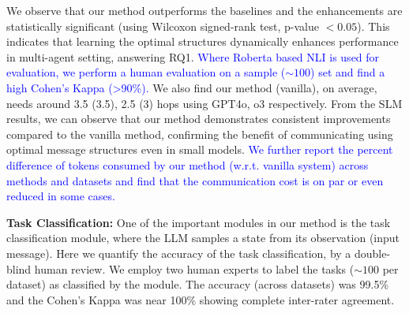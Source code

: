 We observe that our method outperforms the baselines and the enhancements are statistically significant (using Wilcoxon signed-rank test, p-value $< 0.05$). This indicates that learning the optimal structures dynamically enhances performance in multi-agent setting, answering RQ1. 
\textcolor{blue}{Where Roberta based NLI is used for evaluation, we perform a human evaluation on a sample ($\sim 100$) set and find a high Cohen's Kappa \cite{Cohen07} (>90\%).}
We also find our method (vanilla), on average, needs around 3.5 (3.5), 2.5 (3) hops using GPT4o, o3 respectively. 
From the SLM results,
 we can observe that our method demonstrates consistent improvements compared to the vanilla method, confirming the benefit of communicating using optimal message structures even in small models. \textcolor{blue}{We further report the percent difference of tokens consumed by our method (w.r.t. vanilla system) across methods and datasets and find that the communication cost is on par or even reduced in some cases.}

\noindent \textbf{Task Classification:}\label{task_classification_results} One of the important modules in our method is the task classification module, where the LLM samples a state from its observation (input message). Here we quantify the accuracy of the task classification, by a double-blind human review. We employ two human experts
 to label the tasks ($\sim 100$ per dataset) as classified by the module. The accuracy (across datasets) was 99.5\% and the Cohen's Kappa \cite{Cohen07} was near 100\% showing complete inter-rater agreement.  

